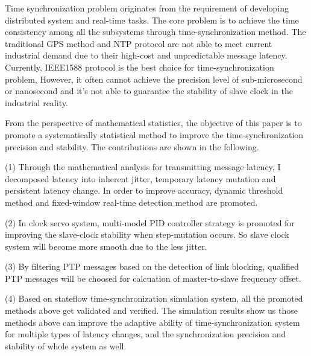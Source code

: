\begin{englishabstract}

Time synchronization problem originates from the requirement of developing distributed system and real-time tasks. The core problem is to achieve the time consistency among all the subsystems through time-synchronization method. The traditional GPS method and NTP protocol are not able to meet current industrial demand due to their high-cost and unpredictable message latency. Currently, IEEE1588 protocol is the best choice for time-synchronization problem, However, it often cannot achieve the precision level of sub-microsecond or nanosecond and it's not able to guarantee the stability of slave clock in the industrial reality.

From the perspective of mathematical statistics, the objective of this paper is to promote a systematically statistical method to improve the time-synchronization precision and stability. The contributions are shown in the following.

(1) Through the mathematical analysis for transmitting message latency, I decomposed latency into inherent jitter, temporary latency mutation and persistent latency change. In order to improve accuracy, dynamic threshold method and fixed-window real-time detection method are promoted.

(2) In clock servo system, multi-model PID controller strategy is promoted for improving the slave-clock stability when step-mutation occurs. So slave clock system will become more smooth due to the less jitter.

(3) By filtering PTP messages based on the detection of link blocking, qualified PTP messages will be choosed for calcuation of master-to-slave frequency offset.


(4) Based on stateflow time-synchronization simulation system, all the promoted methods above get validated and verified. The simulation results show us those methods above can improve the adaptive ability of time-synchronization system for multiple types of latency changes, and the synchronization precision and stability of whole system as well.

\end{englishabstract}